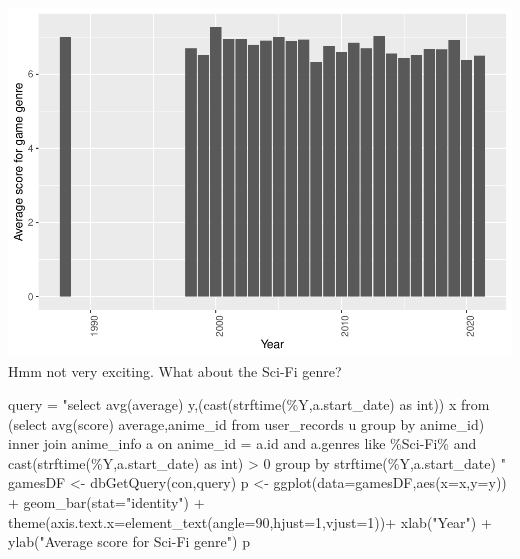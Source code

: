 \documentclass[
]{article}
\newenvironment{Shaded}{\begin{snugshade}}{\end{snugshade}}
\newcommand{\AttributeTok}[1]{\textcolor[rgb]{0.77,0.63,0.00}{#1}}
\newcommand{\DecValTok}[1]{\textcolor[rgb]{0.00,0.00,0.81}{#1}}
\newcommand{\FunctionTok}[1]{\textcolor[rgb]{0.00,0.00,0.00}{#1}}
\newcommand{\NormalTok}[1]{#1}
\newcommand{\OtherTok}[1]{\textcolor[rgb]{0.56,0.35,0.01}{#1}}
\newcommand{\SpecialCharTok}[1]{\textcolor[rgb]{0.00,0.00,0.00}{#1}}
\newcommand{\StringTok}[1]{\textcolor[rgb]{0.31,0.60,0.02}{#1}}
\begin{document}
\includegraphics{R_analysis_files/figure-latex/unnamed-chunk-6-1.pdf}
Hmm not very exciting. What about the Sci-Fi genre?

\begin{Shaded}
\begin{Highlighting}[]
\NormalTok{query }\OtherTok{=} \StringTok{"select avg(average) y,(cast(strftime(\textquotesingle{}\%Y\textquotesingle{},a.start\_date) as int)) x from }
\StringTok{(select avg(score) average,anime\_id from user\_records u group by anime\_id)  inner join anime\_info a on anime\_id = a.id and a.genres like \textquotesingle{}\%Sci{-}Fi\%\textquotesingle{} }
\StringTok{and cast(strftime(\textquotesingle{}\%Y\textquotesingle{},a.start\_date) as int) \textgreater{} 0}
\StringTok{group by strftime(\textquotesingle{}\%Y\textquotesingle{},a.start\_date) "}
\NormalTok{gamesDF }\OtherTok{\textless{}{-}} \FunctionTok{dbGetQuery}\NormalTok{(con,query)}
\NormalTok{p }\OtherTok{\textless{}{-}} \FunctionTok{ggplot}\NormalTok{(}\AttributeTok{data=}\NormalTok{gamesDF,}\FunctionTok{aes}\NormalTok{(}\AttributeTok{x=}\NormalTok{x,}\AttributeTok{y=}\NormalTok{y)) }\SpecialCharTok{+}
  \FunctionTok{geom\_bar}\NormalTok{(}\AttributeTok{stat=}\StringTok{"identity"}\NormalTok{) }\SpecialCharTok{+}
  \FunctionTok{theme}\NormalTok{(}\AttributeTok{axis.text.x=}\FunctionTok{element\_text}\NormalTok{(}\AttributeTok{angle=}\DecValTok{90}\NormalTok{,}\AttributeTok{hjust=}\DecValTok{1}\NormalTok{,}\AttributeTok{vjust=}\DecValTok{1}\NormalTok{))}\SpecialCharTok{+}
  \FunctionTok{xlab}\NormalTok{(}\StringTok{"Year"}\NormalTok{) }\SpecialCharTok{+} \FunctionTok{ylab}\NormalTok{(}\StringTok{"Average score for Sci{-}Fi genre"}\NormalTok{)}
\NormalTok{p}
\end{Highlighting}
\end{Shaded}
\end{document}
